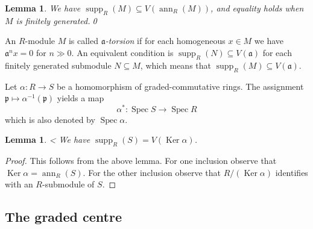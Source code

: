 \documentclass{amsart}[a4]
\newtheorem{lemma}[theorem]{Lemma}
\theoremstyle{definition}
\theoremstyle{remark}
\numberwithin{equation}{section}
\newcommand{\ann}{\operatorname{ann}}
\newcommand{\Ker}{\operatorname{Ker}}
\newcommand{\Spec}{\operatorname{Spec}}
\newcommand{\supp}{\operatorname{supp}}
\newcommand{\lto}{\longrightarrow}
\newcommand{\fa}{\mathfrak{a}}
\newcommand{\fp}{\mathfrak{p}}
\newcommand{\fq}{\mathfrak{q}}
\begin{document}
\begin{lemma}
  We have $\supp_R(M)\subseteq V(\ann_R(M))$, and equality holds when
  $M$ is finitely generated.\qed
\end{lemma}

An $R$-module $M$ is called \emph{$\fa$-torsion} if for each
homogeneous $x\in M$ we have $\fa^nx=0$ for $n\gg 0$. An equivalent
condition is $\supp_R(N)\subseteq V(\fa)$ for each finitely generated
submodule $N\subseteq M$, which means that $\supp_R(M)\subseteq
V(\fa)$.

Let $\alpha\colon R\to S$ be a homomorphism of graded-commutative
rings. The assignment $\fp\mapsto\alpha^{-1}(\fp)$ yields  a map
\[ \alpha^*\colon\Spec S\lto\Spec R\]
which is also denoted by $\Spec\alpha$.

\begin{lemma}\label{le:supp-ring-hom}
<  We have $\supp_R(S)=V(\Ker\alpha)$.
\end{lemma}
\begin{proof}
This follows from the above lemma. For one inclusion observe that
  $\Ker\alpha=\ann_R(S)$. For the other inclusion observe that
  $R/(\Ker\alpha)$ identifies with an $R$-submodule of $S$.
\end{proof}

\subsection*{The graded centre}
\end{document}
